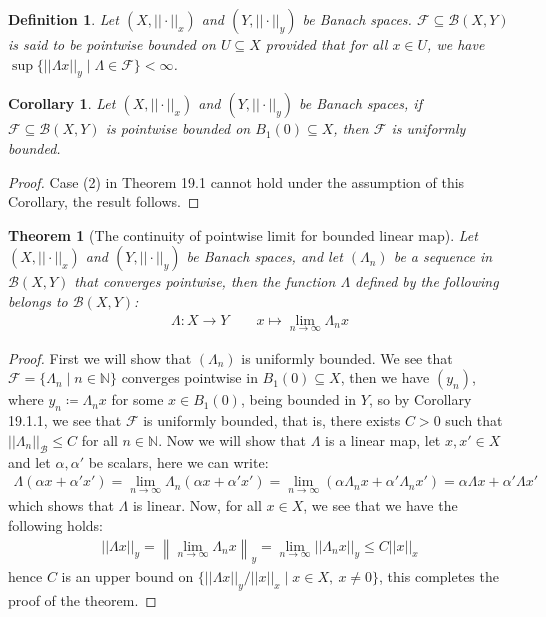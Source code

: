 \documentclass[11pt]{book}
\theoremstyle{break}
\theoremstyle{break}
\newtheorem{thm}{Theorem}[section]
\newtheorem{corT}[lem]{Corollary}
\newtheorem{defn}{Definition}[corL]
\newcommand{\N}{\mathbb{N}}
\newcommand{\F}{\mathcal{F}}
\begin{document}
\begin{defn}
Let $(X,||\cdot ||_x)$ and $(Y, ||\cdot ||_y)$ be Banach spaces. $\F \subseteq \mathcal{B}(X,Y)$ is said to be pointwise bounded on $U\subseteq X$ provided that for all $x \in U$, we have $\sup\{ ||\Lambda x||_y \mid \Lambda \in \F\} < \infty$. 
\end{defn}

\begin{corT}
Let $(X,||\cdot ||_x)$ and $(Y, ||\cdot ||_y)$ be Banach spaces, if $\F \subseteq \mathcal{B}(X,Y)$ is pointwise bounded on $B_1(0) \subseteq X$, then $\F$ is uniformly bounded.  
\end{corT}
\begin{proof}
Case (2) in Theorem 19.1 cannot hold under the assumption of this Corollary, the result follows. 
\end{proof}


\begin{thm}[The continuity of pointwise limit for bounded linear map]
Let $(X,||\cdot ||_x)$ and $(Y, ||\cdot ||_y)$ be Banach spaces, and let $(\Lambda_n)$ be a sequence in $\mathcal{B}(X,Y)$ that converges pointwise, then the function $\Lambda$ defined by the following belongs to $\mathcal{B}(X,Y)$:
\begin{align*}
\Lambda:X \to Y \qquad x\mapsto \lim_{n\to \infty}\Lambda_n x
\end{align*}
\end{thm}
\begin{proof}
First we will show that $(\Lambda_n)$ is uniformly bounded. We see that $\F = \{\Lambda_n \mid n \in \N\}$ converges pointwise in $B_1(0)\subseteq X$, then we have $(y_n)$, where $y_n \coloneqq \Lambda_n x$ for some $x \in B_1(0)$, being bounded in $Y$, so by Corollary 19.1.1, we see that $\F$ is uniformly bounded, that is, there exists $C >0$ such that $||\Lambda_n ||_{\mathcal{B}}\leq C$ for all $n \in \N$. Now we will show that $\Lambda$ is a linear map, let $x,x'\in X$ and let $\alpha, \alpha'$ be scalars, here we can write:
\begin{align*}
\Lambda(\alpha x + \alpha' x') = \lim_{n\to \infty}\Lambda_n(\alpha x + \alpha' x') = \lim_{n\to \infty}\left( \alpha \Lambda_n x + \alpha' \Lambda_n x'\right) = \alpha \Lambda x + \alpha' \Lambda x'
\end{align*}
which shows that $\Lambda$ is linear. Now, for all $x \in X$, we see that we have the following holds:
\begin{align*}
||\Lambda x||_y = \left\| \lim_{n \to \infty}\Lambda_n x\right\|_y = \lim_{n \to \infty}||\Lambda_n x||_y \leq C ||x||_x
\end{align*}
hence $C$ is an upper bound on $\{ ||\Lambda x||_y / ||x||_x \mid x\in X,\ x\neq 0\}$, this completes the proof of the theorem. 
\end{proof}
\end{document}
